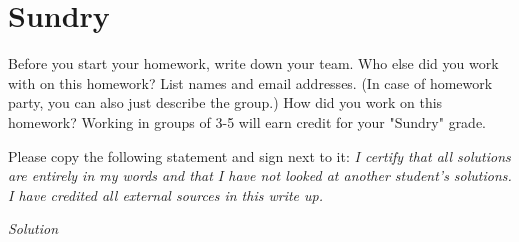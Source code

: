 \documentclass{article}\usepackage{amsmath,amssymb,amsthm,tikz,tkz-graph,color,chngpage,soul,hyperref,csquotes,graphicx,floatrow, yfonts}\newcommand*{\QEDB}{\hfill\ensuremath{\square}}\newtheorem*{prop}{Proposition}\renewcommand{\theenumi}{\alph{enumi}}\usepackage[shortlabels]{enumitem}\usepackage[nobreak=true, framemethod=tikz]{mdframed}\usetikzlibrary{matrix,calc, automata, positioning}\MakeOuterQuote{"}\usepackage[margin=1in]{geometry} \newtheorem{theorem}{Theorem}
\begin{document}

\section*{Sundry}
Before you start your homework, write down your team. Who else did you work with on this
homework? List names and email addresses. (In case of homework party, you can also just describe
the group.) How did you work on this homework? Working in groups of 3-5 will earn credit for
your "Sundry" grade.
\begin{flushleft}
Please copy the following statement and sign next to it:\linebreak\linebreak
\textit{I certify that all solutions are entirely in my words and that I have not looked at another student’s
solutions. I have credited all external sources in this write up.}
\end{flushleft}

\begin{mdframed}
    \textit{Solution}
\end{mdframed}
\end{document}
